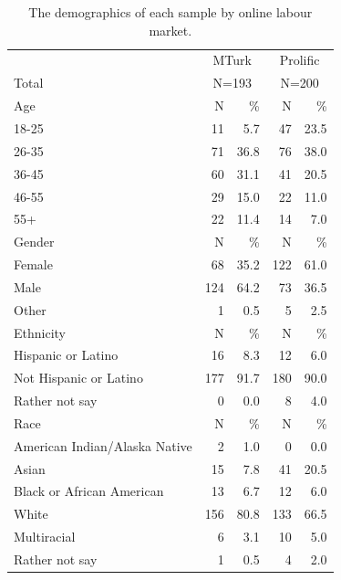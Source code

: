 \documentclass[a4paper,notitlepage,12pt]{article}
\begin{document}
\begin{refsection}[supp]
\begin{table}[!h]
\centering
\small
\setlength{\tabcolsep}{15pt}
\begin{tabular}{ lrrrr }
\toprule
& \multicolumn{2}{c}{MTurk} & \multicolumn{2}{c}{Prolific} \\
\cmidrule(lr){2-3} \cmidrule(lr){4-5}
Total & \multicolumn{2}{c}{N=193} & \multicolumn{2}{c}{N=200} \\
\midrule
Age & N & \% & N & \% \\
\cmidrule(lr){1-5}
18-25   &    11 &   5.7 &     47 &  23.5 \\
26-35   &    71 &  36.8 &     76 &  38.0 \\
36-45   &    60 &  31.1 &     41 &  20.5 \\
46-55   &    29 &  15.0 &     22 &  11.0 \\
55+     &    22 &  11.4 &     14 &   7.0 \\
\midrule
Gender & N & \% & N & \% \\
\cmidrule(lr){1-5}
Female &      68 &  35.2 &      122 &  61.0 \\
Male   &     124 &  64.2 &       73 &  36.5 \\
Other  &       1 &   0.5 &        5 &   2.5 \\
\midrule
Ethnicity & N & \% & N & \% \\
\cmidrule(lr){1-5}
Hispanic or Latino     &    16 &   8.3 &     12 &   6.0 \\
Not Hispanic or Latino &   177 &  91.7 &    180 &  90.0 \\
Rather not say         &     0 &   0.0 &      8 &   4.0 \\
\midrule
Race & N & \% & N & \% \\
\cmidrule(lr){1-5}
American Indian/Alaska Native &     2 &   1.0 &      0 &   0.0 \\
Asian                         &    15 &   7.8 &     41 &  20.5 \\
Black or African American     &    13 &   6.7 &     12 &   6.0 \\
White                         &   156 &  80.8 &    133 &  66.5 \\
Multiracial                   &     6 &   3.1 &     10 &   5.0 \\
Rather not say                &     1 &   0.5 &      4 &   2.0 \\
\bottomrule
\end{tabular}
\captionsetup{width=0.88\textwidth}
\caption{The demographics of each sample by online labour market.}
\label{tab:demographics_02}
\end{table}


\end{refsection}
\end{document}
